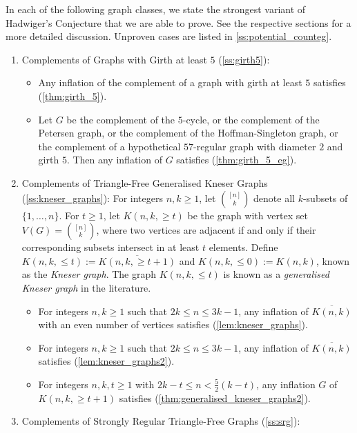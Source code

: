 \documentclass[11pt]{article}
\numberwithin{equation}{section}
\theoremstyle{plain}
\theoremstyle{definition}
\renewcommand{\geq}{\geqslant}
\renewcommand{\leq}{\leqslant}
\newcommand{\defn}[1]{\textcolor{green!50!black}{\textit{#1}}}
\begin{document}
In each of the following graph classes, we state the strongest variant of Hadwiger's Conjecture that we are able to prove. See the respective sections for a more detailed discussion. Unproven cases are listed in \cref{ss:potential_counteg}.
\begin{enumerate}[label={},leftmargin=0em]
    \item Complements of Graphs with Girth at least $5$ (\cref{ss:girth5}):
          \begin{itemize}
              \item Any inflation of the complement of a graph with girth at least $5$ satisfies  (\cref{thm:girth_5}).
              \item Let $G$ be the complement of the $5$-cycle, or the complement of the Petersen graph, or the complement of the Hoffman-Singleton graph, or the complement of a hypothetical $57$-regular graph with diameter $2$ and girth $5$. Then any inflation of $G$ satisfies  (\cref{thm:girth_5_eg}).
          \end{itemize}
    \item Complements of Triangle-Free Generalised Kneser Graphs (\cref{ss:kneser_graphs}): For integers $n, k \geq 1$, let \defn{$\binom{[n]}{k}$} denote all $k$-subsets of $\{1, \dots, n\}$. For $t \geq 1$, let $K(n,k, \geq t)$ be the graph with vertex set $V(G) = \binom{[n]}{k}$, where two vertices are adjacent if and only if their corresponding subsets intersect in at least $t$ elements. Define $K(n,k, \leq t):= \overline{K(n,k, \geq t+1)}$ and $K(n,k,\leq 0):= K(n,k)$, known as the \defn{Kneser graph}. The graph $K(n, k, \leq t)$ is known as a \defn{generalised Kneser graph} in the literature.
          \begin{itemize}
              \item For integers $n,k \geq 1$ such that $2k \leq n \leq 3k - 1$, any inflation of $\overline{K(n,k)}$ with an even number of vertices satisfies  (\cref{lem:kneser_graphs}).
              \item For integers $n,k \geq 1$ such that $2k \leq n \leq 3k - 1$, any inflation of $\overline{K(n,k)}$ satisfies  (\cref{lem:kneser_graphs2}).
              \item For integers $n,k,t \geq 1$ with $2k - t \leq n < \frac{5}{2} (k-t)$, any inflation $G$ of $K(n, k,\geq t+1)$ satisfies  (\cref{thm:generalised_kneser_graphs2}).
          \end{itemize}
    \item Complements of Strongly Regular Triangle-Free Graphs (\cref{ss:srg}):

\end{enumerate}
\end{document}
